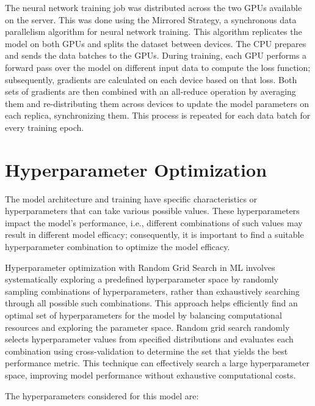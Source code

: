 The neural network training job was distributed across the two GPUs available on the server. This was done using the Mirrored Strategy, a synchronous data parallelism algorithm for neural network training. This algorithm replicates the model on both GPUs and splits the dataset between devices. The CPU prepares and sends the data batches to the GPUs. During training, each GPU performs a forward pass over the model on different input data to compute the loss function; subsequently, gradients are calculated on each device based on that loss. Both sets of gradients are then combined with an all-reduce operation by averaging them and re-distributing them across devices to update the model parameters on each replica, synchronizing them. This process is repeated for each data batch for every training epoch.


\section{Hyperparameter Optimization}
\label{sec:HyperparameterOptimization}
The model architecture and training have specific characteristics or hyperparameters that can take various possible values. These hyperparameters impact the model's performance, i.e., different combinations of such values may result in different model efficacy; consequently, it is important to find a suitable hyperparameter combination to optimize the model efficacy.

Hyperparameter optimization with Random Grid Search \cite{bengio_practical_2012} in ML involves systematically exploring a predefined hyperparameter space by randomly sampling combinations of hyperparameters, rather than exhaustively searching through all possible such combinations. This approach helps efficiently find an optimal set of hyperparameters for the model by balancing computational resources and exploring the parameter space. Random grid search randomly selects hyperparameter values from specified distributions and evaluates each combination using cross-validation to determine the set that yields the best performance metric. This technique can effectively search a large hyperparameter space, improving model performance without exhaustive computational costs.

The hyperparameters considered for this model are:

